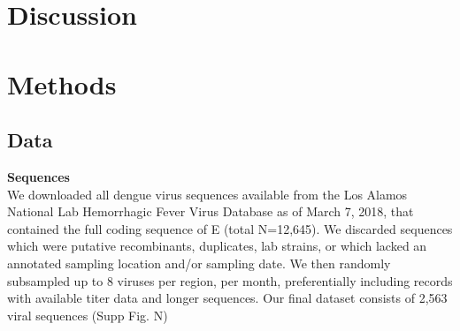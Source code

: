 \documentclass[11pt,oneside,letterpaper]{article}
\begin{document}
\begin{centering}
\end{centering}

\section*{Discussion}


\newpage

\section*{Methods}
\subsection*{Data}
\textbf{Sequences}\\
We downloaded all dengue virus sequences available from the Los Alamos National Lab Hemorrhagic Fever Virus Database as of March 7, 2018, that contained the full coding sequence of E (total N=12,645).
We discarded sequences which were putative recombinants, duplicates, lab strains, or which lacked an annotated sampling location and/or sampling date.
We then randomly subsampled up to 8 viruses per region, per month, preferentially including records with available titer data and longer sequences.
Our final dataset consists of 2,563 viral sequences (Supp Fig. N)
\end{document}
